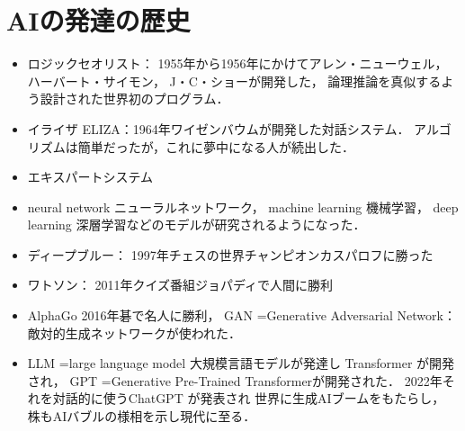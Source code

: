 \section{AIの発達の歴史}
\begin{itemize}
   \item
   ロジックセオリスト：
   1955年から1956年にかけてアレン・ニューウェル，ハーバート・サイモン，
   J・C・ショーが開発した，
   論理推論を真似するよう設計された世界初のプログラム．
  
   \item 
   イライザ ELIZA：1964年ワイゼンバウムが開発した対話システム．
   アルゴリズムは簡単だったが，これに夢中になる人が続出した．
 
   \item  
   エキスパートシステム
   
   \item  
     neural network ニューラルネットワーク，
     machine learning 機械学習，
     deep learning  深層学習などのモデルが研究されるようになった．
 
    \item    
   ディープブルー： 1997年チェスの世界チャンピオンカスパロフに勝った
    \item    
   ワトソン： 2011年クイズ番組ジョパディで人間に勝利
   
    \item    
   AlphaGo 2016年碁で名人に勝利，  
   GAN =Generative Adversarial Network：敵対的生成ネットワークが使われた．
  

     \item
     LLM =large language model 大規模言語モデルが発達し
     Transformer が開発され，
     GPT =Generative Pre-Trained Transformerが開発された．
      2022年それを対話的に使うChatGPT が発表され
      世界に生成AIブームをもたらし，
      株もAIバブルの様相を示し現代に至る．

   
\end{itemize}


